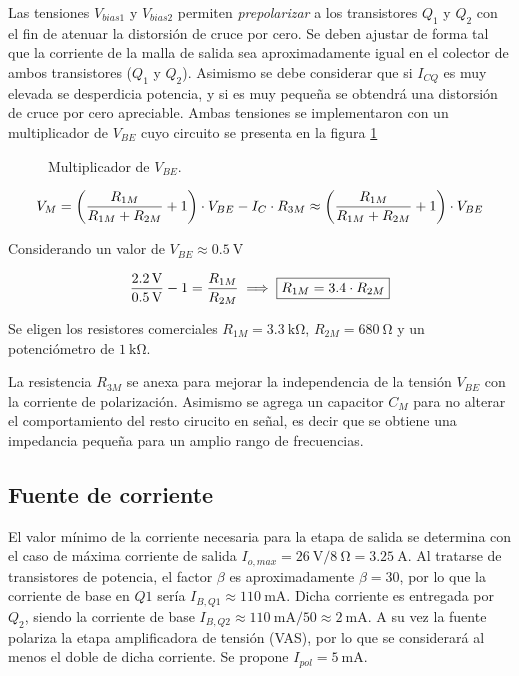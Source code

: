 	Las tensiones $V_{bias1}$ y $V_{bias2}$ permiten \textit{prepolarizar} a los transistores $Q_1$ y $Q_2$ con el fin de atenuar la distorsión de cruce por cero. Se deben ajustar de forma tal que la corriente de la malla de salida sea aproximadamente igual en el colector de ambos transistores ($Q_1$ y $Q_2$). Asimismo se debe considerar que si $I_{CQ}$ es muy elevada se desperdicia potencia, y si es muy pequeña se obtendrá una distorsión de cruce por cero apreciable. Ambas tensiones se implementaron con un multiplicador de $V_{BE}$ cuyo circuito se presenta en la figura \ref{fig.multiplicador}

	\begin{figure}[H]
		\centering
		\scalebox{0.5}{}
		\caption{Multiplicador de $V_{BE}$.}
		\label{fig.multiplicador}
	\end{figure}


	\begin{equation}
		\centering
		V_M = \left( \frac{R_{1M}}{R_{1M} + R_{2M}} +1 \right) \cdot V_{BE} - I_C \cdot R_{3M} \approx  \left( \frac{R_{1M}}{R_{1M} + R_{2M}} +1 \right) \cdot V_{BE}
	\end{equation}

	 Considerando un valor de $V_{BE} \approx \SI{0.5}{\volt}$

	 \begin{equation}
	 	\centering
		\frac{\SI{2.2}{\volt}}{\SI{0.5}{\volt}} -1 = \frac{R_{1M}}{R_{2M}} \implies \boxed{R_{1M} = \num{3,4} \cdot R_{2M}}
	\end{equation}

	Se eligen los resistores comerciales $R_{1M} = \SI{3.3}{\kilo\ohm}$, $R_{2M} = \SI{680}{\ohm}$ y un potenciómetro de $\SI{1}{\kilo\ohm}$. 

	La resistencia $R_{3M}$ se anexa para mejorar la independencia de la tensión $V_{BE}$ con la corriente de polarización. Asimismo se agrega un capacitor $C_M$ para no alterar el comportamiento del resto cirucito en señal, es decir que se obtiene una impedancia pequeña para un amplio rango de frecuencias. 


\subsection{Fuente de corriente}
	El valor mínimo de la corriente necesaria para la etapa de salida se determina con el caso de máxima corriente de salida $I_{o,max} = \SI{26}{\volt}/ \SI{8}{\ohm} = \SI{3.25}{\ampere}$. Al tratarse de transistores de potencia, el factor $\beta$ es aproximadamente $\beta = 30$, por lo que la corriente de base en $Q1$ sería $I_{B,Q1} \approx \SI{110}{\milli\ampere}$. Dicha corriente es entregada por $Q_2$, siendo la corriente de base $I_{B,Q2} \approx \SI{110}{\milli\ampere}/50 \approx \SI{2}{\milli\ampere}$. A su vez la fuente polariza la etapa amplificadora de tensión (VAS), por lo que se considerará al menos el doble de dicha corriente. Se propone $I_{pol} = \SI{5}{\milli\ampere}$.

